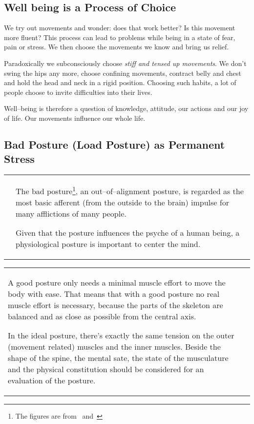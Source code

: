 \documentclass[../main.tex]{subfiles}
\begin{document}
\subsection{Well being is a Process of Choice}

We try out movements and wonder: does that {work better}?
Is this movement more fluent?
This process can lead to problems while being in a state of fear, pain or stress.
We then choose the movements we know and bring us relief.

Paradoxically we subconsciously choose \emph{stiff and tensed up movements}.
We don't swing the hips any more, choose confining movements, contract belly and chest and hold the head and neck in a rigid position.
Choosing such habits, a lot of people choose to  {invite difficulties} into their lives.

{Well--being} is therefore a question of knowledge, attitude, our actions and our joy of life.
Our movements influence our whole life.

\subsection{Bad Posture (Load Posture) as Permanent Stress}

\noindent
\begin{minipage}{\textwidth}
\begin{tabular}{p{4cm}p{7.6cm}}

  \raisebox{-0.8\totalheight}{  \texttt{[image: Thumb\_head]} }

  &
The bad posture\footnote{The figures are from~\cite{Haltung} and~\cite{Darmreinig}}\index{posture!bad}, an out--of--alignment posture, is regarded as the {most basic afferent} (from the outside to the brain) impulse for many afflictions of many people. 

Given that the posture influences the psyche of a human being, a physiological posture is important to {center the mind}.\index{posture!psyche} 
\end{tabular}

\noindent
\begin{tabular}{p{7.6cm}p{4cm}}
A good posture only needs a {minimal muscle effort to move} the body with ease.\index{posture!good, natural}
That means that with a good posture no real muscle effort is necessary, because the parts of the skeleton are {balanced} and as close as possible from the {central axis}. 

In the ideal posture, there's exactly the {same tension} on the outer (movement related) muscles and the inner muscles.
{Beside the shape of the spine, the mental sate, the state of the musculature and the physical constitution should be considered for an evaluation of the posture.}
  &
     \raisebox{-0.85\totalheight}{  \texttt{[image: Smiling\_Guy]} }
\end{tabular}
\end{minipage}
\end{document}
